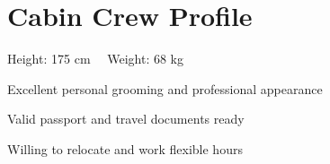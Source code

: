 \documentclass[a4paper,11pt]{article}
\begin{document}
\section{Cabin Crew Profile}
\begin{itemize}[leftmargin=0.15in, label=\textbullet, itemsep=2pt]
  \small{
  \item Height: 175 cm \ \textbar\ Weight: 68 kg
  \item Excellent personal grooming and professional appearance
  \item Valid passport and travel documents ready
  \item Willing to relocate and work flexible hours
  }
\end{itemize}
\end{document}
